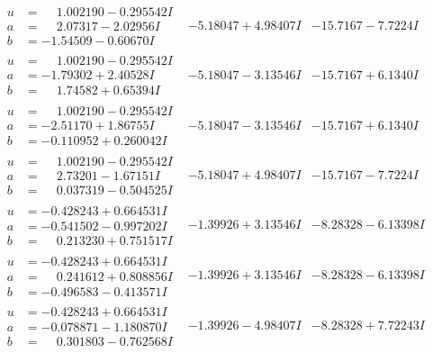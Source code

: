 \documentclass[1p]{elsarticle_modified}
\theoremstyle{definition}
\begin{document}
$$\begin{array}{c|c|c}
\begin{aligned}
u &= \phantom{-}1.002190 - 0.295542 I \\
a &= \phantom{-}2.07317 - 2.02956 I \\
b &= -1.54509 - 0.60670 I\end{aligned}
 & -5.18047 + 4.98407 I & -15.7167 - 7.7224 I \\ \hline\begin{aligned}
u &= \phantom{-}1.002190 - 0.295542 I \\
a &= -1.79302 + 2.40528 I \\
b &= \phantom{-}1.74582 + 0.65394 I\end{aligned}
 & -5.18047 - 3.13546 I & -15.7167 + 6.1340 I \\ \hline\begin{aligned}
u &= \phantom{-}1.002190 - 0.295542 I \\
a &= -2.51170 + 1.86755 I \\
b &= -0.110952 + 0.260042 I\end{aligned}
 & -5.18047 - 3.13546 I & -15.7167 + 6.1340 I \\ \hline\begin{aligned}
u &= \phantom{-}1.002190 - 0.295542 I \\
a &= \phantom{-}2.73201 - 1.67151 I \\
b &= \phantom{-}0.037319 - 0.504525 I\end{aligned}
 & -5.18047 + 4.98407 I & -15.7167 - 7.7224 I \\ \hline\begin{aligned}
u &= -0.428243 + 0.664531 I \\
a &= -0.541502 - 0.997202 I \\
b &= \phantom{-}0.213230 + 0.751517 I\end{aligned}
 & -1.39926 + 3.13546 I & -8.28328 - 6.13398 I \\ \hline\begin{aligned}
u &= -0.428243 + 0.664531 I \\
a &= \phantom{-}0.241612 + 0.808856 I \\
b &= -0.496583 - 0.413571 I\end{aligned}
 & -1.39926 + 3.13546 I & -8.28328 - 6.13398 I \\ \hline\begin{aligned}
u &= -0.428243 + 0.664531 I \\
a &= -0.078871 - 1.180870 I \\
b &= \phantom{-}0.301803 - 0.762568 I\end{aligned}
 & -1.39926 - 4.98407 I & -8.28328 + 7.72243 I \\ \hline\begin{aligned}

\end{aligned}
\end{array}$$
\end{document}
